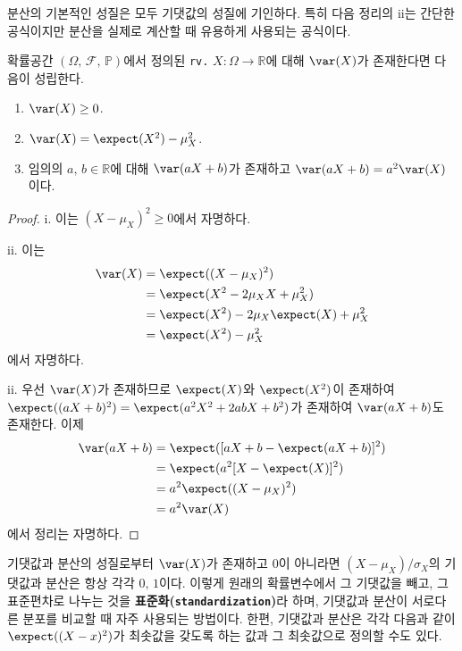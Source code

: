 분산의 기본적인 성질은 모두 기댓값의 성질에 기인하다. 특히 다음 정리의 ii는 간단한 공식이지만 분산을 실제로 계산할 때 유용하게 사용되는 공식이다.

\begin{theorem}
    확률공간 $(\Omega,\,\mathcal{F},\,\mathbb{P})$에서 정의된 \texttt{rv.} $X:\Omega\to\mathbb{R}$에 대해 $\var(X)$가 존재한다면 다음이 성립한다.
    \begin{enumerate}
        \item $\var(X)\geq0$.
        \item $\var(X)=\expect(X^2)-\mu_X^2$.
        \item 임의의 $a,\,b\in\mathbb{R}$에 대해 $\var(aX+b)$가 존재하고 $\var(aX+b)=a^2\var(X)$이다.
    \end{enumerate}
\end{theorem}

\begin{proof}
    i. 이는 $(X-\mu_X)^2\geq0$에서 자명하다.

    ii. 이는
    \begin{align*}
        \var(X)&=\expect((X-\mu_X)^2)\\
        &=\expect(X^2-2\mu_XX+\mu_X^2)\\
        &=\expect(X^2)-2\mu_X\expect(X)+\mu_X^2\\
        &=\expect(X^2)-\mu_X^2
    \end{align*}
    에서 자명하다.

    ii. 우선 $\var(X)$가 존재하므로 $\expect(X)$와 $\expect(X^2)$이 존재하여 $\expect((aX+b)^2)=\expect(a^2X^2+2abX+b^2)$가 존재하여 $\var(aX+b)$도 존재한다. 이제
    \begin{align*}
        \var(aX+b)&=\expect([aX+b-\expect(aX+b)]^2)\\
        &=\expect(a^2[X-\expect(X)]^2)\\
        &=a^2\expect((X-\mu_X)^2)\\
        &=a^2\var(X)
    \end{align*}
   에서 정리는 자명하다.
\end{proof}

기댓값과 분산의 성질로부터 $\var(X)$가 존재하고 $0$이 아니라면 $(X-\mu_X)/\sigma_X$의 기댓값과 분산은 항상 각각 $0,\,1$이다. 이렇게 원래의 확률변수에서 그 기댓값을 빼고, 그 표준편차로 나누는 것을 \textbf{표준화(\texttt{standardization})}라 하며, 기댓값과 분산이 서로다른 분포를 비교할 때 자주 사용되는 방법이다. 한편, 기댓값과 분산은 각각 다음과 같이 $\expect((X-x)^2)$가 최솟값을 갖도록 하는 값과 그 최솟값으로 정의할 수도 있다.

